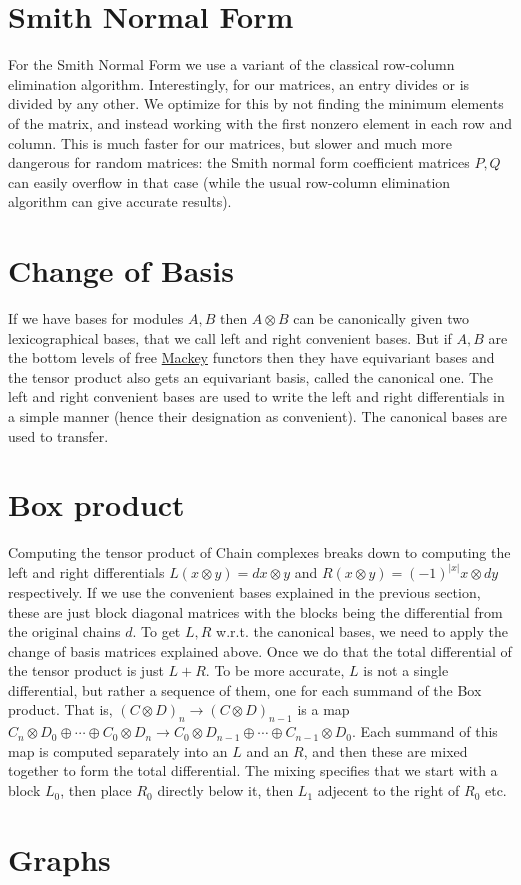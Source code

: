 \hypertarget{algo_smith}{}\section{Smith Normal Form}\label{algo_smith}
For the Smith Normal Form we use a variant of the classical row-\/column elimination algorithm. Interestingly, for our matrices, an entry divides or is divided by any other. We optimize for this by not finding the minimum elements of the matrix, and instead working with the first nonzero element in each row and column. This is much faster for our matrices, but slower and much more dangerous for random matrices\+: the Smith normal form coefficient matrices $P,Q$ can easily overflow in that case (while the usual row-\/column elimination algorithm can give accurate results).\hypertarget{algo_cob}{}\section{Change of Basis}\label{algo_cob}
If we have bases for modules $A,B$ then $A\otimes B$ can be canonically given two lexicographical bases, that we call left and right convenient bases. But if $A,B$ are the bottom levels of free \hyperlink{namespaceMackey}{Mackey} functors then they have equivariant bases and the tensor product also gets an equivariant basis, called the canonical one. The left and right convenient bases are used to write the left and right differentials in a simple manner (hence their designation as convenient). The canonical bases are used to transfer. \hypertarget{algo_box}{}\section{Box product}\label{algo_box}
Computing the tensor product of Chain complexes breaks down to computing the left and right differentials $L(x\otimes y)=dx\otimes y$ and $R(x\otimes y)=(-1)^{|x|}x\otimes dy$ respectively. If we use the convenient bases explained in the previous section, these are just block diagonal matrices with the blocks being the differential from the original chains $d$. To get $L,R$ w.\+r.\+t. the canonical bases, we need to apply the change of basis matrices explained above. Once we do that the total differential of the tensor product is just $L+R$. To be more accurate, $L$ is not a single differential, but rather a sequence of them, one for each summand of the Box product. That is, $(C\otimes D)_n\to (C\otimes D)_{n-1}$ is a map $C_n\otimes D_0\oplus\cdots \oplus C_0\otimes D_n\to C_0\otimes D_{n-1}\oplus\cdots\oplus C_{n-1}\otimes D_0$. Each summand of this map is computed separately into an $L$ and an $R$, and then these are mixed together to form the total differential. The mixing specifies that we start with a block $ L_0$, then place $ R_0$ directly below it, then $L_1$ adjecent to the right of $ R_0$ etc.\hypertarget{algo_graph}{}\section{Graphs}\label{algo_graph}

